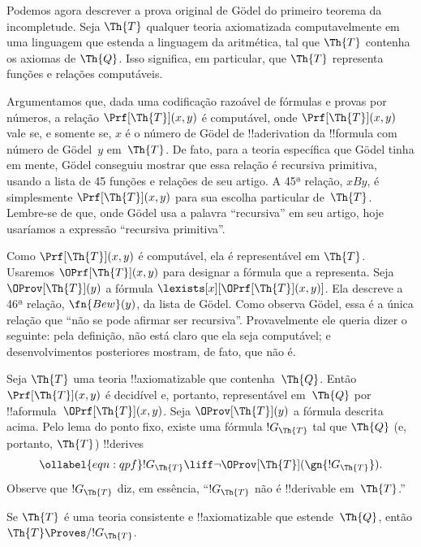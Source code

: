 \documentclass[../../../include/open-logic-section]{subfiles}
\begin{document}


Podemos agora descrever a prova original de G\"odel do primeiro teorema da
incompletude. Seja $\Th{T}$ qualquer teoria axiomatizada computavelmente em
uma linguagem que estenda a linguagem da aritmética, tal que $\Th{T}$
contenha os axiomas de $\Th{Q}$. Isso significa, em particular, que $\Th{T}$
representa funções e relações computáveis.

Argumentamos que, dada uma codificação razoável de fórmulas e provas por
números, a relação $\Prf[\Th{T}](x,y)$ é computável, onde
$\Prf[\Th{T}](x,y)$ vale se, e somente se, $x$ é o número de G\"odel de
!!a{derivation} da !!{formula} com número de G\"odel~$y$ em~$\Th{T}$. De
fato, para a teoria específica que G\"odel tinha em mente, G\"odel conseguiu
mostrar que essa relação é recursiva primitiva, usando a lista de 45 funções
e relações de seu artigo. A 45ª relação, $x B y$, é simplesmente
$\Prf[\Th{T}](x,y)$ para sua escolha particular de~$\Th{T}$. Lembre-se de
que, onde G\"odel usa a palavra ``recursiva'' em seu artigo, hoje usaríamos
a expressão ``recursiva primitiva''.

Como $\Prf[\Th{T}](x,y)$ é computável, ela é representável em $\Th{T}$.
Usaremos $\OPrf[\Th{T}](x,y)$ para designar a fórmula que a representa.
Seja $\OProv[\Th{T}](y)$ a fórmula
$\lexists[x][\OPrf[\Th{T}](x,y)]$. Ela descreve a 46ª relação,
$\fn{Bew}(y)$, da lista de G\"odel. Como observa G\"odel, essa é a única
relação que ``não se pode afirmar ser recursiva''. Provavelmente ele queria
dizer o seguinte: pela definição, não está claro que ela seja computável;
e desenvolvimentos posteriores mostram, de fato, que não é.

Seja $\Th{T}$ uma teoria !!{axiomatizable} que contenha~$\Th{Q}$. Então
$\Prf[\Th{T}](x, y)$ é decidível e, portanto, representável em~$\Th{Q}$ por
!!a{formula}~$\OPrf[\Th{T}](x, y)$. Seja $\OProv[\Th{T}](y)$ a fórmula
descrita acima. Pelo lema do ponto fixo, existe uma fórmula $!G_\Th{T}$ tal
que $\Th{Q}$ (e, portanto, $\Th{T}$) !!{derive}s
\begin{equation}
\ollabel{eqn:qpf}
!G_\Th{T} \liff \lnot \OProv[\Th{T}](\gn{!G_\Th{T}}).
\end{equation}
Observe que $!G_\Th{T}$ diz, em essência, ``$!G_\Th{T}$ não é
!!{derivable} em~$\Th{T}$.''

\begin{lem}
Se $\Th{T}$ é uma teoria consistente e !!{axiomatizable} que
estende~$\Th{Q}$, então $\Th{T} \Proves/ !G_\Th{T}$.
\end{lem}
\end{document}
